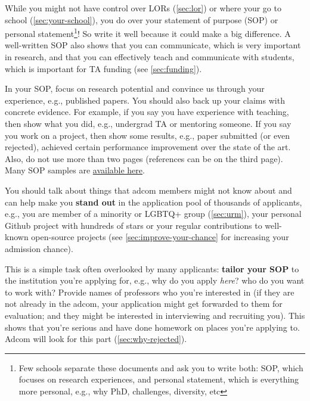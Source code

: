 \documentclass[oneside,11pt,dvipsnames]{book}
\begin{document}
While you might not have control over LORs (\autoref{sec:lor}) or where your go to school (\autoref{sec:your-school}), you do over your
statement of purpose (SOP) or personal statement\footnote{Few schools separate these documents and ask you to write both: SOP, which focuses on research experiences, and personal statement, which is everything more personal, e.g., why PhD, challenges, diversity, etc}! So write it well because it could make a big difference. A well-written SOP also shows that you can communicate, which is very important in research, and that you can effectively teach and communicate with students, which is important for TA funding (see \autoref{sec:funding}).


In your SOP, focus on research potential and convince us through your experience, e.g., published papers. You should also back up your claims with concrete evidence. For example, if you say you have experience with teaching, then show what you did, e.g., undergrad TA or mentoring someone.  If you say you work on a project, then show some results, e.g., paper submitted (or even rejected), achieved certain performance improvement over the state of the art. Also, do not use more than two pages (references can be on the third page). Many SOP samples are \href{https://cs-sop.org/}{available here}. 


You should talk about things that adcom members might not know about and can help make you \textbf{stand out} in the application pool of thousands of applicants, e.g., you are member of a minority or LGBTQ+ group (\autoref{sec:urm}), your personal Github project with hundreds of stars or your regular contributions to well-known open-source projects (see \autoref{sec:improve-your-chance} for increasing your admission chance).


This is a simple task often overlooked by many applicants: \textbf{tailor your SOP} to the institution you're applying for,
e.g., why do you apply \emph{here}? who do you want to work with?
Provide names of professors who you're interested in (if they are not already in the adcom, your application might get forwarded to them for evaluation; and they might be interested in interviewing and recruiting you).
This shows that you're serious and have done homework on places you're applying to.
Adcom will look for this part (\autoref{sec:why-rejected}).
\end{document}
